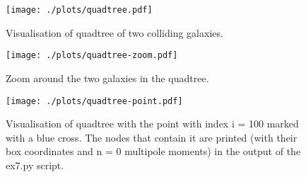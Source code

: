 \documentclass{article}
\begin{document}
\begin{figure}[!h]
\centering
\begin{minipage}[t]{7.8cm}
    \centering
    \texttt{[image: ./plots/quadtree.pdf]}
    \caption{Visualisation of quadtree of two colliding galaxies.}
    \label{fig:Quadtree}
\end{minipage}
\qquad
\begin{minipage}[t]{7.8cm}
    \centering
    \texttt{[image: ./plots/quadtree-zoom.pdf]}
    \caption{Zoom around the two galaxies in the quadtree.}
    \label{fig:Quadtree-zoom}
\end{minipage}
\end{figure}

\begin{figure}
    \centering
    \texttt{[image: ./plots/quadtree-point.pdf]}
    \caption{Visualisation of quadtree with the point with index i = 100 marked with a blue cross. The nodes that contain it are printed (with their box coordinates and n = 0 multipole moments) in the output of the ex7.py script.}
    \label{fig:Quadtree-point}
\end{figure}
\end{document}
